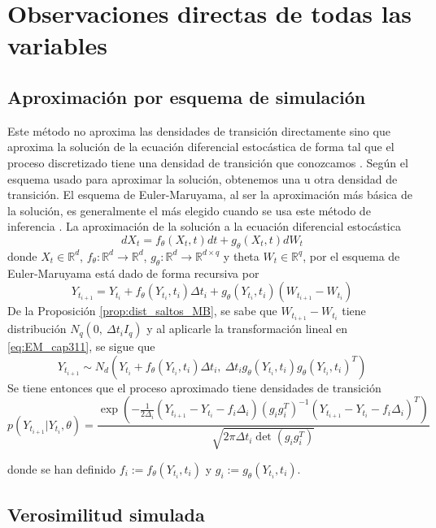 \section{Observaciones directas de todas las variables}

\subsection{Aproximación por esquema de simulación}

Este método no aproxima las densidades de transición directamente 
sino que aproxima la solución de la ecuación diferencial 
estocástica de forma tal que el proceso discretizado tiene 
una densidad de transición que conozcamos 
\cite{iacusSimulationInferenceStochastic2008}. Según el esquema
usado para aproximar la solución, obtenemos una u otra densidad de 
transición. El esquema de Euler-Maruyama, al ser la aproximación 
más básica de la solución, es generalmente el más elegido 
cuando se usa este método de inferencia \cite{ozdemircalikusuFittingItoStochastic2021}.
La aproximación de la solución a la ecuación diferencial estocástica
\begin{equation*}
    dX_t = f_\theta(X_t,t)dt + g_\theta(X_t,t)dW_t
\end{equation*}
donde $X_t\in \mathbb R^d$, $f_\theta:\mathbb R^d \to 
\mathbb R^d$, $g_\theta: \mathbb R^d \to \mathbb R^{d\times q}$ y theta
$W_t\in \mathbb R^q$, por el esquema de Euler-Maruyama está 
dado de forma recursiva por 
\begin{equation}\label{eq:EM_cap311}
    Y_{t_{i+1}}= Y_{t_i} + f_\theta(Y_{t_i},t_i)\Delta t_i + 
g_\theta(Y_{t_i},t_i)(W_{t_{i+1}}-W_{t_i})
\end{equation}
De la Proposición \ref{prop:dist_saltos_MB}, se sabe que 
$W_{t_{i+1}}-W_{t_i}$ tiene distribución $N_q(0,\ \Delta t_i I_q)$ y 
al aplicarle la transformación lineal en \ref{eq:EM_cap311}, 
se sigue que
$$Y_{t_{i+1}}\sim N_d\left(Y_{t_i} + f_\theta(Y_{t_i},t_i)\Delta t_i,\ 
\Delta t_i g_\theta(Y_{t_i},t_i)g_\theta(Y_{t_i},t_i)^T\right)$$
Se tiene entonces que el proceso aproximado tiene densidades de 
transición 
$$p(Y_{t_{i+1}}|Y_{t_i},\theta) = \frac{\exp\left(-\frac{1}{2\Delta_i}(Y_{t_{i+1}}-
Y_{t_i}-f_i\Delta_i)(g_ig_i^T)^{-1}(Y_{t_{i+1}}-
Y_{t_i}-f_i\Delta_i)^T \right)}{\sqrt{2\pi 
\Delta t_i \det(g_ig_i^T)}}$$

donde se han definido $f_i:=f_\theta(Y_{t_i},t_i)$ y 
$g_i:=g_\theta(Y_{t_i},t_i)$.


\subsection{Verosimilitud simulada}


